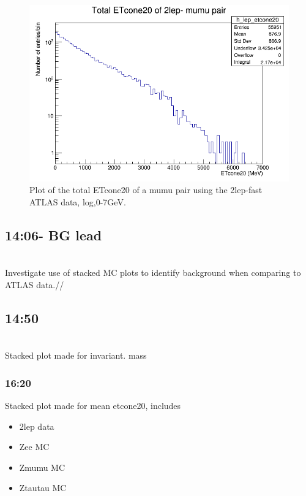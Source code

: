 \begin{figure}[h!]
    \centering
    \includegraphics[width=0.85\linewidth]{plots/16-02-2021/2lep-fast_mumu-pair_etcone20(total)_log-entries_0-7GeV_16-02-2021_11-33.png}
    \caption{Plot of the total ETcone20 of a mumu pair using the 2lep-fast ATLAS data, log,0-7GeV. }\label{fig:2lep-fast_mumu-pair_etcone20(total)_log-entries_0-7GeV_16-02-2021_11-33}
\end{figure}

\subsection*{14:06- BG lead}\\
Investigate use of stacked MC plots to identify background when comparing to ATLAS data.//

\subsection*{14:50}\\
Stacked plot made for invariant. mass

\subsubsection*{16:20}
Stacked plot made for mean etcone20, includes
\begin{itemize}
    \item 2lep data
    \item Zee MC
    \item Zmumu MC
    \item Ztautau MC
\end{itemize}

